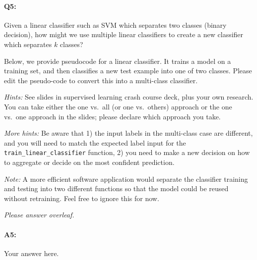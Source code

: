 







\pagebreak
\paragraph{Q5:} Given a linear classifier such as SVM which separates two classes (binary decision), how might we use multiple linear classifiers to create a new classifier which separates $k$ classes?

Below, we provide pseudocode for a linear classifier. It trains a model on a training set, and then classifies a new test example into one of two classes. Please edit the pseudo-code to convert this into a multi-class classifier. 

\emph{Hints:} See slides in supervised learning crash course deck, plus your own research. You can take either the one vs.~all (or one vs.~others) approach or the one vs.~one approach in the slides; please declare which approach you take.

\emph{More hints:} Be aware that 1) the input labels in the multi-class case are different, and you will need to match the expected label input for the \texttt{train\_linear\_classifier} function, 2) you need to make a new decision on how to aggregate or decide on the most confident prediction.

\emph{Note:} A more efficient software application would separate the classifier training and testing into two different functions so that the model could be reused without retraining. Feel free to ignore this for now.

\emph{Please answer overleaf.}

\pagebreak
\paragraph{A5:} Your answer here.

